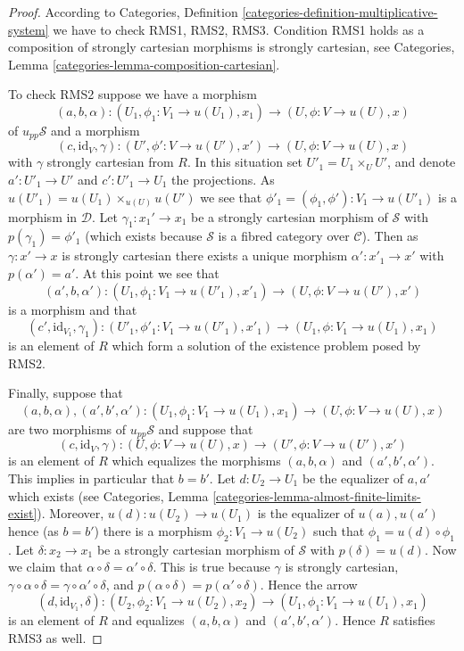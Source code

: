 \begin{proof}
According to
Categories, Definition \ref{categories-definition-multiplicative-system}
we have to check RMS1, RMS2, RMS3.
Condition RMS1 holds as a composition of strongly cartesian morphisms is
strongly cartesian, see
Categories, Lemma \ref{categories-lemma-composition-cartesian}.

\medskip\noindent
To check RMS2 suppose we have a morphism
$$
(a, b, \alpha) :
(U_1, \phi_1 : V_1 \to u(U_1), x_1)
\longrightarrow
(U, \phi : V \to u(U), x)
$$
of $u_{pp}\mathcal{S}$ and a morphism
$$
(c, \text{id}_V, \gamma) :
(U', \phi' : V \to u(U'), x')
\longrightarrow
(U, \phi : V \to u(U), x)
$$
with $\gamma$ strongly cartesian from $R$. In this situation set
$U'_1 = U_1 \times_U U'$, and denote $a' : U'_1 \to U'$ and
$c' : U'_1 \to U_1$ the projections.
As $u(U'_1) = u(U_1) \times_{u(U)} u(U')$
we see that $\phi'_1 = (\phi_1, \phi') : V_1 \to u(U'_1)$ is
a morphism in $\mathcal{D}$. Let $\gamma_1 : x_1' \to x_1$
be a strongly cartesian morphism of $\mathcal{S}$ with
$p(\gamma_1) = \phi'_1$ (which exists because $\mathcal{S}$ is a
fibred category over $\mathcal{C}$). Then as $\gamma : x' \to x$ is
strongly cartesian there exists a unique morphism
$\alpha' : x'_1 \to x'$ with $p(\alpha') = a'$.
At this point we see that
$$
(a', b, \alpha') :
(U_1, \phi_1 : V_1 \to u(U'_1), x'_1)
\longrightarrow
(U, \phi : V \to u(U'), x')
$$
is a morphism and that
$$
(c', \text{id}_{V_1}, \gamma_1) :
(U'_1, \phi'_1 : V_1 \to u(U'_1), x'_1)
\longrightarrow
(U_1, \phi : V_1 \to u(U_1), x_1)
$$
is an element of $R$ which form a solution of the existence problem
posed by RMS2.

\medskip\noindent
Finally, suppose that
$$
(a, b, \alpha), (a', b', \alpha') :
(U_1, \phi_1 : V_1 \to u(U_1), x_1)
\longrightarrow
(U, \phi : V \to u(U), x)
$$
are two morphisms of $u_{pp}\mathcal{S}$ and suppose that
$$
(c, \text{id}_V, \gamma) :
(U, \phi : V \to u(U), x)
\longrightarrow
(U', \phi : V \to u(U'), x')
$$
is an element of $R$ which equalizes the morphisms
$(a, b, \alpha)$ and $(a', b', \alpha')$. This implies in particular
that $b = b'$. Let $d : U_2 \to U_1$ be the equalizer of $a, a'$ which
exists (see
Categories, Lemma \ref{categories-lemma-almost-finite-limits-exist}).
Moreover, $u(d) : u(U_2) \to u(U_1)$ is the equalizer of $u(a), u(a')$
hence (as $b = b'$) there is a morphism $\phi_2 : V_1 \to u(U_2)$ such that
$\phi_1 = u(d) \circ \phi_1$. Let $\delta : x_2 \to x_1$ be a strongly
cartesian morphism of $\mathcal{S}$ with $p(\delta) = u(d)$.
Now we claim that $\alpha \circ \delta = \alpha' \circ \delta$.
This is true because
$\gamma$ is strongly cartesian,
$\gamma \circ \alpha \circ \delta = \gamma \circ \alpha' \circ \delta$, and
$p(\alpha \circ \delta) = p(\alpha' \circ \delta)$.
Hence the arrow
$$
(d, \text{id}_{V_1}, \delta) :
(U_2, \phi_2 : V_1 \to u(U_2), x_2)
\longrightarrow
(U_1, \phi_1 : V_1 \to u(U_1), x_1)
$$
is an element of $R$ and equalizes $(a, b, \alpha)$ and $(a', b', \alpha')$.
Hence $R$ satisfies RMS3 as well.
\end{proof}

